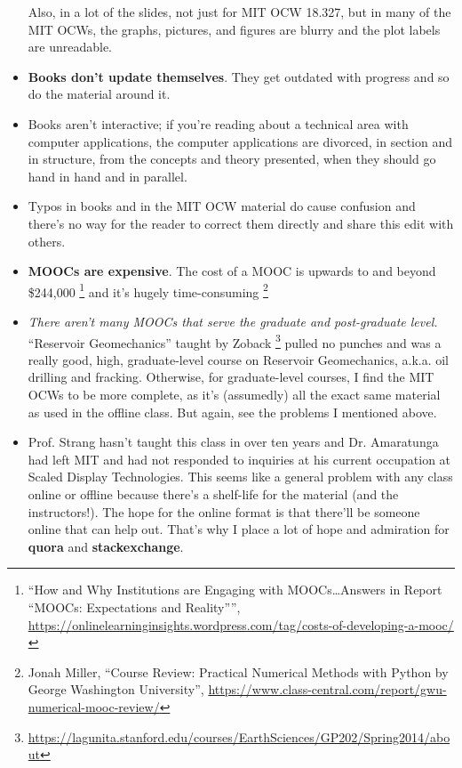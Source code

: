 \documentclass[twoside]{amsart}
\theoremstyle{plain}
\theoremstyle{definition}
\theoremstyle{remark}
\numberwithin{equation}{section}
\begin{document}
\begin{itemize}
Also, in a lot of the slides, not just for MIT OCW 18.327, but in many of the MIT OCWs, the graphs, pictures, and figures are blurry and the plot labels are unreadable.  
\item \textbf{Books don't update themselves}.  They get outdated with progress and so do the material around it.  
\item Books aren't interactive; if you're reading about a technical area with computer applications, the computer applications are divorced, in section and in structure, from the concepts and theory presented, when they should go hand in hand and in parallel.   
\item Typos in books and in the MIT OCW material do cause confusion and there's no way for the reader to correct them directly and share this edit with others.  
\item \textbf{MOOCs are expensive}.  The cost of a MOOC is upwards to and beyond \$244,000 \footnote{``How and Why Institutions are Engaging with MOOCs…Answers in Report “MOOCs: Expectations and Reality”'', \url{https://onlinelearninginsights.wordpress.com/tag/costs-of-developing-a-mooc/}} and it's hugely time-consuming \footnote{Jonah Miller, ``Course Review: Practical Numerical Methods with Python by George Washington University'', \url{https://www.class-central.com/report/gwu-numerical-mooc-review/}} 
\item \emph{There aren't many MOOCs that serve the graduate and post-graduate level.}  ``Reservoir Geomechanics'' taught by Zoback \footnote{\url{https://lagunita.stanford.edu/courses/EarthSciences/GP202/Spring2014/about}} pulled no punches and was a really good, high, graduate-level course on Reservoir Geomechanics, a.k.a. oil drilling and fracking.  Otherwise, for graduate-level courses, I find the MIT OCWs to be more complete, as it's (assumedly) all the exact same material as used in the offline class.  But again, see the problems I mentioned above.   
\item Prof. Strang hasn't taught this class in over ten years and Dr. Amaratunga had left MIT and had not responded to inquiries at his current occupation at Scaled Display Technologies.  This seems like a general problem with any class online or offline because there's a shelf-life for the material (and the instructors!).  The hope for the online format is that there'll be someone online that can help out.  That's why I place a lot of hope and admiration for \textbf{quora} and \textbf{stackexchange}.
\end{itemize}
\end{document}
